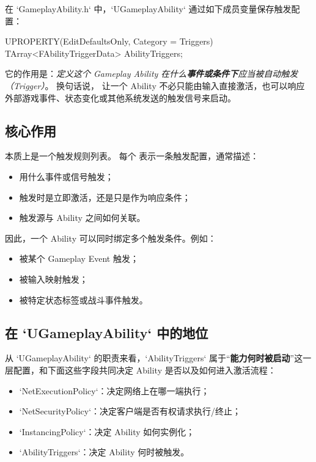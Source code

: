 \documentclass[10pt,CJKmath]{ctexart}
\begin{document}
在 `GameplayAbility.h` 中，`UGameplayAbility` 通过如下成员变量保存触发配置：

\begin{code}
UPROPERTY(EditDefaultsOnly, Category = Triggers)
TArray<FAbilityTriggerData> AbilityTriggers;
\end{code}

它的作用是：\emph{定义这个 Gameplay Ability 在什么\textbf{事件或条件下}应当被自动触发（Trigger）}。  
换句话说， 让一个 Ability 不必只能由输入直接激活，也可以响应外部游戏事件、状态变化或其他系统发送的触发信号来启动。

\subsection{核心作用}

 本质上是一个触发规则列表。  
每个  表示一条触发配置，通常描述：

\begin{itemize}
	\item 用什么事件或信号触发；
	\item 触发时是立即激活，还是只是作为响应条件；
	\item 触发源与 Ability 之间如何关联。
\end{itemize}

因此，一个 Ability 可以同时绑定多个触发条件。例如：

\begin{itemize}
	\item 被某个 Gameplay Event 触发；
	\item 被输入映射触发；
	\item 被特定状态标签或战斗事件触发。
\end{itemize}

\subsection{在 `UGameplayAbility` 中的地位}

从 `UGameplayAbility` 的职责来看，`AbilityTriggers` 属于“\textbf{能力何时被启动}”这一层配置，和下面这些字段共同决定 Ability 是否以及如何进入激活流程：

\begin{itemize}
	\item `NetExecutionPolicy`：决定网络上在哪一端执行；
	\item `NetSecurityPolicy`：决定客户端是否有权请求执行/终止；
	\item `InstancingPolicy`：决定 Ability 如何实例化；
	\item `AbilityTriggers`：决定 Ability 何时被触发。
\end{itemize}
\end{document}
